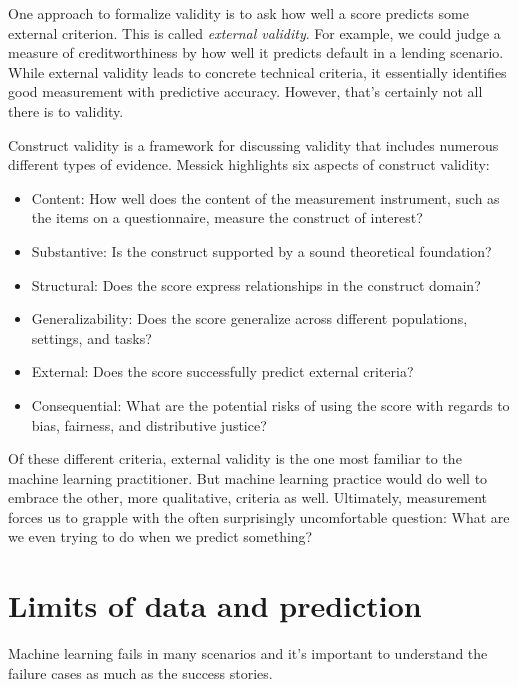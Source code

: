 \documentclass{tufte-book}
\begin{document}
One approach to formalize validity is to ask how well a score predicts
some external criterion. This is called \emph{external validity}. For
example, we could judge a measure of creditworthiness by how well it
predicts default in a lending scenario. While external validity leads to
concrete technical criteria, it essentially identifies good measurement
with predictive accuracy. However, that's certainly not all there is to
validity.

Construct validity is a framework for discussing validity that includes
numerous different types of evidence. Messick highlights six aspects of
construct validity:

\begin{itemize}
\tightlist
\item
  Content: How well does the content of the measurement instrument, such
  as the items on a questionnaire, measure the construct of interest?
\item
  Substantive: Is the construct supported by a sound theoretical
  foundation?
\item
  Structural: Does the score express relationships in the construct
  domain?
\item
  Generalizability: Does the score generalize across different
  populations, settings, and tasks?
\item
  External: Does the score successfully predict external criteria?
\item
  Consequential: What are the potential risks of using the score with
  regards to bias, fairness, and distributive justice?
\end{itemize}

Of these different criteria, external validity is the one most familiar
to the machine learning practitioner. But machine learning practice
would do well to embrace the other, more qualitative, criteria as well.
Ultimately, measurement forces us to grapple with the often surprisingly
uncomfortable question: What are we even trying to do when we predict
something?

\hypertarget{limits-of-data-and-prediction}{%
\section{Limits of data and
prediction}\label{limits-of-data-and-prediction}}

Machine learning fails in many scenarios and it's important to
understand the failure cases as much as the success stories.
\end{document}
